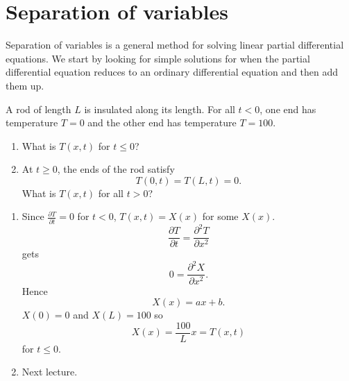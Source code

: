\section{Separation of variables}

Separation of variables is a general method for solving linear 
partial differential equations.
We start by looking for simple solutions for when the
partial differential equation reduces to an ordinary
differential equation and then add them up.

\begin{example}
    A rod of length $L$ is insulated along its length.
    For all $t < 0$, one end has temperature $T = 0$
    and the other end has temperature $T = 100$.
    \begin{enumerate}
        \item What is $T(x,t)$ for $t \leq 0$?

        \item At $t \geq 0$, the ends of the rod satisfy
            \[
                T(0,t) = T(L,t) = 0.
            \]
            What is $T(x,t)$ for all $t > 0$?
    \end{enumerate}
\end{example}

\begin{solution}
    \hfill
    \begin{enumerate}
        \item
            Since
            $\frac{\partial T}{\partial t} = 0$
            for $t<0$,
            $T(x,t) = X(x)$ for some $X(x)$.
            \[
                \frac{\partial T}{\partial t}
                = \frac{\partial^2 T}{\partial x^2} 
            \]
            gets
            \[
                0 = \frac{\partial^2 X}{\partial x^2}.
            \]
            Hence
            \[
                X(x) = ax + b.
            \]
            $X(0) = 0$ and $X(L) = 100$ so
            \[
                X(x) = \frac{100}{L} x = T(x,t)
            \]
            for $t \leq 0$.

        \item Next lecture.
    \end{enumerate}
\end{solution}
